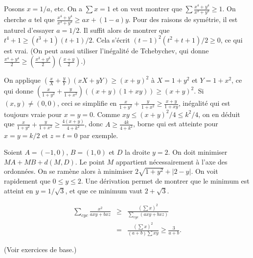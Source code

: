 \begin{sol}
 Posons $x=1/a$, etc. On a $\sum x=1$ et on veut montrer que $\sum\frac{x^4+y^4}{x^3+y^3}\geqslant 1$. On cherche $a$ tel que $\frac{x^4+y^4}{x^3+y^3}\geqslant ax+(1-a)y$.
Pour des raisons de sym\'etrie, il est naturel d'essayer $a=1/2$. Il suffit alors de montrer que $t^4+1\geqslant(t^3+1)(t+1)/2$. Cela s'\'ecrit $(t-1)^2(t^2+t+1)/2\geqslant 0$, ce qui est vrai. (On peut aussi utiliser l'in\'egalit\'e de Tchebychev, qui donne $\frac{x^4+y^4}{2}\geqslant (\frac{x^3+y^3}{2})(\frac{x+y}{2})$.)
\end{sol}

\begin{sol}
 On applique $(\frac{x}{X}+\frac{y}{Y})(xX+yY)\geqslant (x+y)^2$ \`a $X=1+y^2$ et $Y=1+x^2$, ce qui donne $(\frac{x}{1+y^2}+\frac{y}{1+x^2})((x+y)(1+xy))\geqslant (x+y)^2$. Si $(x,y)\ne (0,0)$, ceci se simplifie en $\frac{x}{1+y^2}+\frac{y}{1+x^2}\geqslant \frac{x+y}{1+xy}$, in\'egalit\'e qui est toujours vraie pour $x=y=0$.
Comme $xy\leqslant (x+y)^2/4\leqslant k^2/4$, on en d\'eduit que $\frac{x}{1+y^2}+\frac{y}{1+x^2}\geqslant \frac{4(x+y)}{4+k^2}$, donc $A\geqslant \frac{4k}{4+k^2}$, borne qui est atteinte pour $x=y=k/2$ et $z=t=0$ par exemple.
\end{sol}

\begin{sol}
 Soient $A=(-1,0)$, $B=(1,0)$ et $D$ la droite $y=2$. On doit minimiser $MA+MB+d(M,D)$. Le point $M$ appartient n\'ecessairement \`a l'axe des ordonn\'ees. On se ram\`ene alors \`a minimiser $2\sqrt{1+y^2}+|2-y|$. On voit rapidement que $0\leqslant y\leqslant 2$. Une d\'erivation permet de montrer que le minimum est atteint en $y=1/\sqrt{3}$, et que ce minimum vaut $2+\sqrt{3}$.
\end{sol}

\begin{sol}
 \begin{eqnarray*}
  \sum_{cyc}\frac{x^2}{axy+bxz}&\geqslant& \frac{(\sum x)^2}{\sum_{cyc}(axy+bxz)}\\
&=& \frac{(\sum x)^2}{(a+b)\sum xy}\geqslant \frac{3}{a+b}.
 \end{eqnarray*}

(Voir exercices de base.)

\end{sol}

